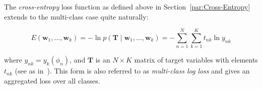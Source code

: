 The \emph{cross-entropy} loss function as defined above in Section~\ref{par:Cross-Entropy} extends to the multi-class case quite naturally:

\begin{equation}
  E(\mathbf{w}_1, \ldots, \mathbf{w}_k) = -\ln p(\mathbf{T} \mid \mathbf{w}_1, \ldots, \mathbf{w}_k) = - \sum_{n=1}^N \sum_{k=1}^K t_{nk} \ln y_{nk}
\end{equation}

where $y_{nk} = y_k (\phi_n)$, and $\mathbf{T}$ is an  $N \times K$ matrix of target variables with elements $t_{nk}$ (see as in~\cite[Chapter 4.3.4, p.~209 ]{Bishop:2006aa}). This form is also referred to as \emph{multi-class log loss} and gives an aggregated loss over all classes.

